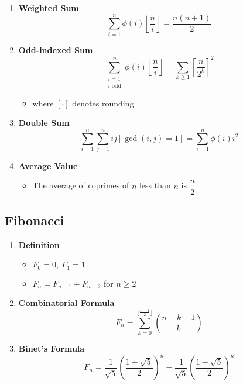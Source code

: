 \documentclass[twoside]{article}
\begin{document}
\begin{multicols*}{2}
\begin{enumerate}[leftmargin=*]
    \item \textbf{Weighted Sum}
        \[\sum_{i=1}^n \phi(i)\left\lfloor\frac{n}{i}\right\rfloor = \frac{n(n+1)}{2}\]
    
    \item \textbf{Odd-indexed Sum}
        \[\sum_{\substack{i=1 \\ i \text{ odd}}}^n \phi(i)\left\lfloor\frac{n}{i}\right\rfloor = \sum_{k \geq 1}\left[\frac{n}{2^k}\right]^2\]
        \begin{itemize}
            \item where $[\cdot]$ denotes rounding
        \end{itemize}
    
    \item \textbf{Double Sum}
        \[\sum_{i=1}^n \sum_{j=1}^n ij[\gcd(i,j)=1] = \sum_{i=1}^n \phi(i)i^2\]
    
    \item \textbf{Average Value}
        \begin{itemize}
            \item The average of coprimes of $n$ less than $n$ is $\dfrac{n}{2}$
        \end{itemize}
\end{enumerate}


{
\subsection*{Fibonacci}
}
\begin{enumerate}[leftmargin=*]
    \item \textbf{Definition}
        \begin{itemize}
            \item $F_0 = 0,\ F_1 = 1$
            \item $F_n = F_{n-1} + F_{n-2}$ for $n \geq 2$
        \end{itemize}
    
    \item \textbf{Combinatorial Formula}
        \[F_n = \sum_{k=0}^{\lfloor\frac{n-1}{2}\rfloor} \binom{n-k-1}{k}\]
    
    \item \textbf{Binet's Formula}
        \[F_n = \frac{1}{\sqrt{5}}\left(\frac{1+\sqrt{5}}{2}\right)^n - \frac{1}{\sqrt{5}}\left(\frac{1-\sqrt{5}}{2}\right)^n\]
    

\end{enumerate}
\end{multicols*}
\end{document}
